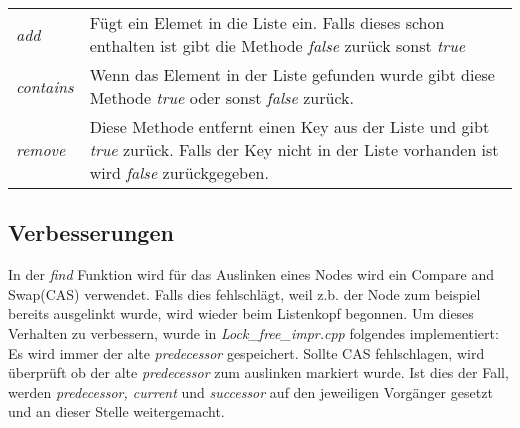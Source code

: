 \documentclass[10pt,a4paper,titlepage,oneside]{article}
\begin{document}
\begin{table}[H]
    \begin{tabularx}{\textwidth}{lX}
        \textit{add} & Fügt ein Elemet in die Liste ein. Falls dieses schon enthalten ist gibt die Methode \textit{false} zurück sonst \textit{true} \\
        \textit{contains} & Wenn das Element in der Liste gefunden wurde gibt diese Methode \textit{true} oder sonst \textit{false} zurück. \\
        \textit{remove} & Diese Methode entfernt einen Key aus der Liste und gibt \textit{true} zurück. Falls der Key nicht in der Liste vorhanden ist wird \textit{false} zurückgegeben. \\
    \end{tabularx}
\end{table}




\subsection{Verbesserungen}
In der \textit{find} Funktion wird für das Auslinken eines Nodes wird ein Compare and Swap(CAS) verwendet. Falls dies fehlschlägt, 
weil z.b. der Node zum beispiel bereits ausgelinkt wurde,
wird wieder beim Listenkopf begonnen. Um dieses Verhalten zu verbessern, wurde in \textit{Lock\_free\_impr.cpp} folgendes implementiert:\\
Es wird immer der alte \textit{predecessor} gespeichert. Sollte CAS fehlschlagen, wird überprüft ob der alte \textit{predecessor}
zum auslinken markiert wurde. Ist dies der Fall, werden \textit{predecessor, current} und \textit{successor} auf den jeweiligen Vorgänger
gesetzt und an dieser Stelle weitergemacht. 


 

	


		
\end{document}
